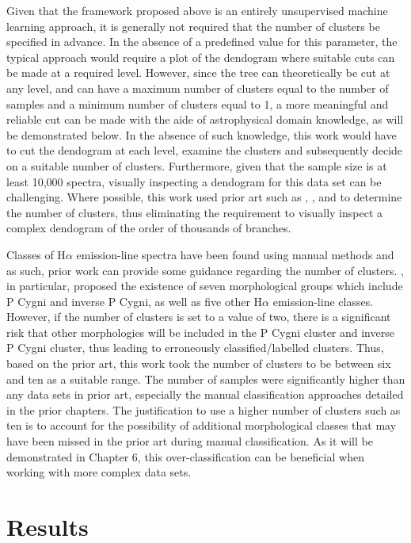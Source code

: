 Given that the framework proposed above is an entirely unsupervised machine learning approach, it is generally not required that the number of clusters be specified in advance. In the absence of a predefined value for this parameter, the typical approach would require a plot of the dendogram where suitable cuts can be made at a required level. However, since the tree can theoretically be cut at any level, and can have a maximum number of clusters equal to the number of samples and a minimum number of clusters equal to 1, a more meaningful and reliable cut can be made with the aide of astrophysical domain knowledge, as will be demonstrated below. In the absence of such knowledge, this work would have to cut the dendogram at each level, examine the clusters and subsequently decide on a suitable number of clusters. Furthermore, given that the sample size is at least 10,000 spectra, visually inspecting a dendogram for this data set can be challenging. Where possible, this work used prior art such as \citet{reipurth1996halpha}, \citet{traven2017galah}, and \citet{zhang2021catalog} to determine the number of clusters, thus eliminating the requirement to visually inspect a complex dendogram of the order of thousands of branches. 

Classes of H$\alpha$ emission-line spectra have been found using manual methods and as such, prior work can provide some guidance regarding the number of clusters. \citet{reipurth1996halpha}, in particular, proposed the existence of seven morphological groups which include P Cygni and inverse P Cygni, as well as five other H$\alpha$ emission-line classes. However, if the number of clusters is set to a value of two, there is a significant risk that other morphologies will be included in the P Cygni cluster and inverse P Cygni cluster, thus leading to erroneously classified/labelled clusters. Thus, based on the prior art, this work took the number of clusters to be between six and ten as a suitable range. The number of samples were significantly higher than any data sets in prior art, especially the manual classification approaches detailed in the prior chapters. The justification to use a higher number of clusters such as ten is to account for the possibility of additional morphological classes that may have been missed in the prior art during manual classification. As it will be demonstrated in Chapter 6, this over-classification can be beneficial when working with more complex data sets.

\section{Results}

